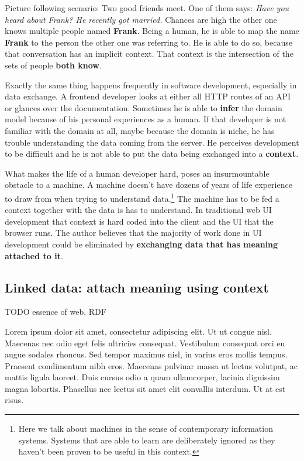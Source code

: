 Picture following scenario: Two good friends meet. One of them says: \textit{Have you heard about Frank? He recently got married.} Chances are high the other one knows multiple people named \textbf{Frank}. Being a human, he is able to map the name \textbf{Frank} to the person the other one was referring to. He is able to do so, because that conversation has an implicit context. That context is the intersection of the sets of people \textbf{both know}.
\par Exactly the same thing happens frequently in software development, especially in data exchange. A frontend developer looks at either all HTTP routes of an API or glances over the documentation. Sometimes he is able to \textbf{infer} the domain model because of his personal experiences as a human. If that developer is not familiar with the domain at all, maybe because the domain is niche, he has trouble understanding the data coming from the server. He perceives development to be difficult and he is not able to put the data being exchanged into a \textbf{context}.
\par What makes the life of a human developer hard, poses an insurmountable obstacle to a machine. A machine doesn't have dozens of years of life experience to draw from when trying to understand data.\footnote{Here we talk about machines in the sense of contemporary information systems. Systems that are able to learn are deliberately ignored as they haven't been proven to be useful in this context.} The machine has to be fed a context together with the data is has to understand. In traditional web UI development that context is hard coded into the client and the UI that the browser runs. The author believes that the majority of work done in UI development could be eliminated by \textbf{exchanging data that has meaning attached to it}.


\subsection{Linked data: attach meaning using context}\label{linkeddata}


TODO essence of web, RDF

Lorem ipsum dolor sit amet, consectetur adipiscing elit. Ut ut congue nisl. Maecenas nec odio eget felis ultricies consequat. Vestibulum consequat orci eu augue sodales rhoncus. Sed tempor maximus nisl, in varius eros mollis tempus. Praesent condimentum nibh eros. Maecenas pulvinar massa ut lectus volutpat, ac mattis ligula laoreet. Duis cursus odio a quam ullamcorper, lacinia dignissim magna lobortis. Phasellus nec lectus sit amet elit convallis interdum. Ut at est risus.

